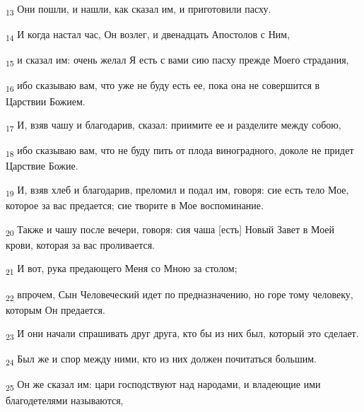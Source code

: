 \begin{tcolorbox}
\textsubscript{13} Они пошли, и нашли, как сказал им, и приготовили пасху.
\end{tcolorbox}
\begin{tcolorbox}
\textsubscript{14} И когда настал час, Он возлег, и двенадцать Апостолов с Ним,
\end{tcolorbox}
\begin{tcolorbox}
\textsubscript{15} и сказал им: очень желал Я есть с вами сию пасху прежде Моего страдания,
\end{tcolorbox}
\begin{tcolorbox}
\textsubscript{16} ибо сказываю вам, что уже не буду есть ее, пока она не совершится в Царствии Божием.
\end{tcolorbox}
\begin{tcolorbox}
\textsubscript{17} И, взяв чашу и благодарив, сказал: приимите ее и разделите между собою,
\end{tcolorbox}
\begin{tcolorbox}
\textsubscript{18} ибо сказываю вам, что не буду пить от плода виноградного, доколе не придет Царствие Божие.
\end{tcolorbox}
\begin{tcolorbox}
\textsubscript{19} И, взяв хлеб и благодарив, преломил и подал им, говоря: сие есть тело Мое, которое за вас предается; сие творите в Мое воспоминание.
\end{tcolorbox}
\begin{tcolorbox}
\textsubscript{20} Также и чашу после вечери, говоря: сия чаша [есть] Новый Завет в Моей крови, которая за вас проливается.
\end{tcolorbox}
\begin{tcolorbox}
\textsubscript{21} И вот, рука предающего Меня со Мною за столом;
\end{tcolorbox}
\begin{tcolorbox}
\textsubscript{22} впрочем, Сын Человеческий идет по предназначению, но горе тому человеку, которым Он предается.
\end{tcolorbox}
\begin{tcolorbox}
\textsubscript{23} И они начали спрашивать друг друга, кто бы из них был, который это сделает.
\end{tcolorbox}
\begin{tcolorbox}
\textsubscript{24} Был же и спор между ними, кто из них должен почитаться большим.
\end{tcolorbox}
\begin{tcolorbox}
\textsubscript{25} Он же сказал им: цари господствуют над народами, и владеющие ими благодетелями называются,
\end{tcolorbox}
